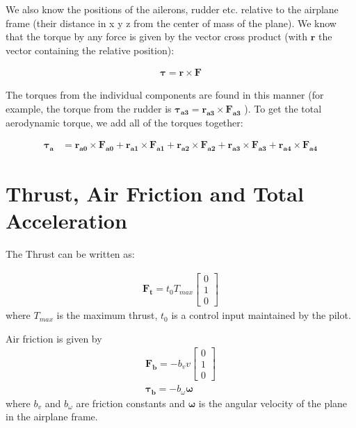 \documentclass[10pt,a4paper]{article}
\begin{document}
We also know the positions of the ailerons, rudder etc. relative to the airplane frame (their distance in x y z from the center of mass of the plane). We know that the torque by any force is given by the vector cross product (with $\boldsymbol{r}$ the vector containing the relative position):

\begin{align}
\boldsymbol{\tau} = \boldsymbol{r} \times \boldsymbol{F}
\end{align}

The torques from the individual components are found in this manner (for example, the torque from the rudder is $\boldsymbol{\tau_{a3}} = \boldsymbol{r_{a3}} \times \boldsymbol{F_{a3}}$ ). To get the total aerodynamic torque, we add all of the torques together:

\begin{align}
\boldsymbol{\tau_a} &= \boldsymbol{r_{a0}} \times \boldsymbol{F_{a0}} + \boldsymbol{r_{a1}} \times \boldsymbol{F_{a1}} + \boldsymbol{r_{a2}} \times \boldsymbol{F_{a2}} + \boldsymbol{r_{a3}} \times \boldsymbol{F_{a3}} + \boldsymbol{r_{a4}} \times \boldsymbol{F_{a4}}
\end{align}

\section{Thrust, Air Friction and Total Acceleration}

The Thrust can be written as:

\begin{align}
\boldsymbol{F_t} = t_0 T_{max} 
\begin{bmatrix}
0 \\ 1 \\ 0
\end{bmatrix}
\end{align}
where $T_{max}$ is the maximum thrust, $t_0$ is a control input maintained by the pilot.

Air friction is given by 
\begin{align}
\boldsymbol{F_b} = -b_v v
\begin{bmatrix}
0 \\ 1 \\ 0
\end{bmatrix}\\
\boldsymbol{\tau_b} = -b_{\omega} \boldsymbol{\omega}
\end{align}
where $b_v$ and $b_{\omega}$ are friction constants and $\boldsymbol{\omega}$ is the angular velocity of the plane in the airplane frame.
\end{document}
